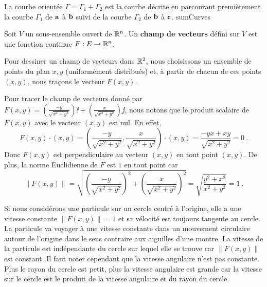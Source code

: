 {
{La courbe orientée $\Gamma = \Gamma_1 + \Gamma_2$ est la courbe
décrite en parcourant premièrement la courbe $\Gamma_1$ de $\mathbf{a}$ à
$\mathbf{b}$ suivi de la courbe $\Gamma_2$ de $\mathbf{b}$ à $\mathbf{c}$.}
{sumCurves}

\begin{focus}{\dfn} 
Soit $V$ un sous-ensemble ouvert de $\mathbb{R}^n$.  Un {\bfseries champ de vecteurs}
défini sur $V$ est une fonction continue $F:E \rightarrow \mathbb{R}^n$.
\end{focus}

Pour dessiner un champ de vecteurs dans $\mathbb{R}^2$, nous choisissons un
ensemble de points du plan $x,y$ (uniformément distribués) et, à partir
de chacun de ces points $(x,y)$, nous traçons le vecteur $F(x,y)$.

\begin{egg}
Pour tracer le champ de vecteurs donné par $\displaystyle
F(x,y) = \left( \frac{-y}{\sqrt{x^2+y^2}}\right) \ii +
\left( \frac{x}{\sqrt{x^2+y^2}}\right)\jj$, nous notons que le produit
scalaire de $F(x,y)$ avec le vecteur $(x,y)$ est nul.  En effet,
\[
  F(x,y) \cdot (x,y)
  = \left( \frac{-y}{\sqrt{x^2+y^2}}, \frac{x}{\sqrt{x^2+y^2}}\right)
  \cdot (x,y) = \frac{-yx + xy}{\sqrt{x^2+y^2}} = 0 \ .
\]
Donc $F(x,y)$ est perpendiculaire au vecteur $(x,y)$ en tout
point $(x,y)$.  De plus, la norme Euclidienne de $F$ est $1$ en
tout point car
\[
  \|F(x,y)\| =
  \sqrt{ \left( \frac{-y}{\sqrt{x^2+y^2}}\right)^2
    + \left(\frac{x}{\sqrt{x^2+y^2}}\right)^2}
  = \sqrt{\frac{y^2 + x^2}{x^2 + y^2}} = 1 \ .
\]


Si nous considérons une particule sur un cercle centré à l'origine, elle a
une vitesse constante $\|F(x,y)\| = 1$ et sa vélocité est
toujours tangente au cercle.  La particule va voyager à une vitesse
constante dans un mouvement circulaire autour de l'origine dans le
sens contraire aux aiguilles d'une montre.  La vitesse de la particule
est indépendante du cercle sur lequel elle se trouve car
$\|F(x,y)\|$ est constant.  Il faut noter cependant que la
vitesse angulaire n'est pas constante.  Plus le rayon du cercle est
petit, plus la vitesse angulaire est grande car la vitesse sur le
cercle est le produit de la vitesse angulaire et du rayon du cercle.
\end{egg}

}
